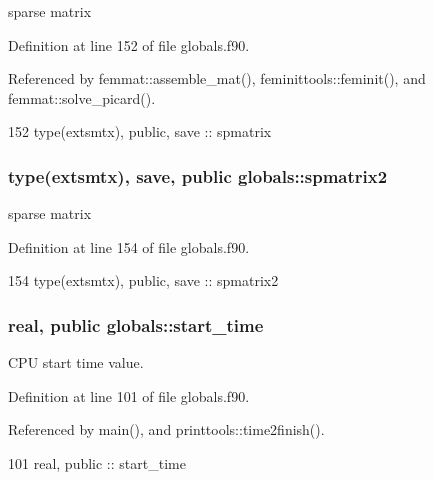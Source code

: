 sparse matrix 



Definition at line 152 of file globals.\+f90.



Referenced by femmat\+::assemble\+\_\+mat(), feminittools\+::feminit(), and femmat\+::solve\+\_\+picard().


\begin{DoxyCode}
152   \textcolor{keywordtype}{type}(extsmtx), \textcolor{keywordtype}{public}, \textcolor{keywordtype}{save} :: spmatrix
\end{DoxyCode}
\subsubsection[{spmatrix2}]{\setlength{\rightskip}{0pt plus 5cm}type({\bf extsmtx}), save, public globals\+::spmatrix2}\label{namespaceglobals_a37297558557adee7c2968a3d59a968b9}


sparse matrix 



Definition at line 154 of file globals.\+f90.


\begin{DoxyCode}
154   \textcolor{keywordtype}{type}(extsmtx), \textcolor{keywordtype}{public}, \textcolor{keywordtype}{save} :: spmatrix2
\end{DoxyCode}
\subsubsection[{start\+\_\+time}]{\setlength{\rightskip}{0pt plus 5cm}real, public globals\+::start\+\_\+time}\label{namespaceglobals_a8feef69a944786f4f7c1838121a1eaff}


C\+PU start time value. 



Definition at line 101 of file globals.\+f90.



Referenced by main(), and printtools\+::time2finish().


\begin{DoxyCode}
101   \textcolor{keywordtype}{real}, \textcolor{keywordtype}{public} :: start_time
\end{DoxyCode}
